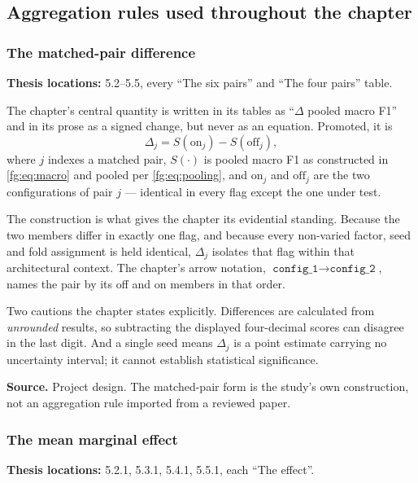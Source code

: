\documentclass[11pt,a4paper]{article}
\numberwithin{equation}{section}
\begin{document}
\subsection{Aggregation rules used throughout the chapter}

\subsubsection{The matched-pair difference}
\label{fg5:pair-difference}
\textbf{Thesis locations:} 5.2--5.5, every ``The six pairs'' and ``The four
pairs'' table.

The chapter's central quantity is written in its tables as
``$\Delta$ pooled macro F1'' and in its prose as a signed change, but never as
an equation. Promoted, it is
\begin{equation}
    \Delta_j = S\!\left(\mathrm{on}_j\right) - S\!\left(\mathrm{off}_j\right),
    \label{fg5:eq:pair-difference}
\end{equation}
where $j$ indexes a matched pair, $S(\cdot)$ is pooled macro F1 as constructed
in \eqref{fg:eq:macro} and pooled per \eqref{fg:eq:pooling}, and
$\mathrm{on}_j$ and $\mathrm{off}_j$ are the two configurations of pair $j$ ---
identical in every flag except the one under test.

The construction is what gives the chapter its evidential standing. Because
the two members differ in exactly one flag, and because every non-varied
factor, seed and fold assignment is held identical, $\Delta_j$ isolates that
flag within that architectural context. The chapter's arrow notation,
$\texttt{config\_1} \rightarrow \texttt{config\_2}$, names the pair by its off
and on members in that order.

Two cautions the chapter states explicitly. Differences are calculated from
\emph{unrounded} results, so subtracting the displayed four-decimal scores can
disagree in the last digit. And a single seed means $\Delta_j$ is a point
estimate carrying no uncertainty interval; it cannot establish statistical
significance.

\textbf{Source.} Project design. The matched-pair form is the study's own
construction, not an aggregation rule imported from a reviewed paper.

\subsubsection{The mean marginal effect}
\label{fg5:mean-effect}
\textbf{Thesis locations:} 5.2.1, 5.3.1, 5.4.1, 5.5.1, each ``The effect''.
\end{document}
